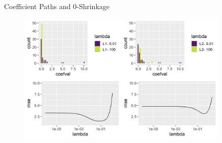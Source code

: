 \documentclass[11pt,compress,t,notes=noshow, xcolor=table]{beamer}
\begin{document}
\begin{vbframe}{Coefficient Paths and 0-Shrinkage}
\begin{figure}
\includegraphics[width=0.9\textwidth]{figure/shrinkage_2.png}\\
\end{figure}

\end{vbframe}
\end{document}
